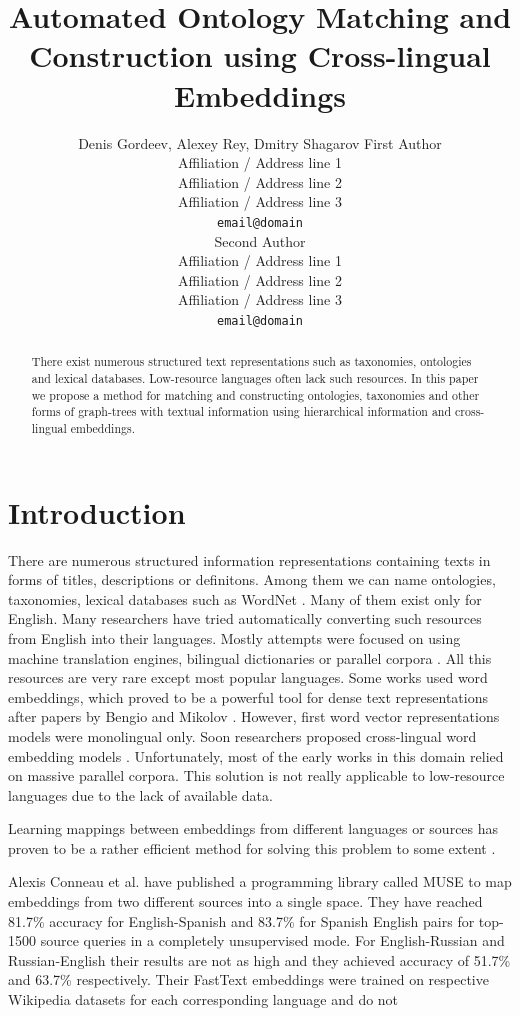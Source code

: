 \documentclass[11pt,a4paper]{article}
\title{Automated Ontology Matching and Construction using Cross-lingual Embeddings}
\author{Denis Gordeev, Alexey Rey, Dmitry Shagarov
	First Author \\
  Affiliation / Address line 1 \\
  Affiliation / Address line 2 \\
  Affiliation / Address line 3 \\
  \texttt{email@domain} \\\And
  Second Author \\
  Affiliation / Address line 1 \\
  Affiliation / Address line 2 \\
  Affiliation / Address line 3 \\
  \texttt{email@domain} \\}
\date{}
\begin{document}
\maketitle
\begin{abstract}
There exist numerous structured text representations such as taxonomies, ontologies and lexical databases. Low-resource languages often lack such resources. In this paper we propose a method for matching and constructing ontologies, taxonomies and other forms of graph-trees with textual information using hierarchical information and cross-lingual embeddings.
\end{abstract}

\section{Introduction}

There are numerous structured information representations containing texts in forms of titles, descriptions or definitons. Among them we can name ontologies, taxonomies, lexical databases such as WordNet \cite{wordnet}. Many of them exist only for English. Many researchers have tried automatically converting such resources from English into their languages. Mostly attempts were focused on using machine translation engines, bilingual dictionaries or parallel corpora \cite{Khodak2017,NEALE18.1030}. All this resources are very rare except most popular languages. Some works used word embeddings, which proved to be a powerful tool for dense text representations after papers by Bengio \cite{bengio} and Mikolov \cite{mikolov-representations-2013}. However, first word vector representations models were monolingual only. Soon researchers proposed cross-lingual word embedding models \cite{mikolov-parallel,lazaridou-parallel}. Unfortunately, most of the early works in this domain relied on massive parallel corpora. This solution is not really applicable to low-resource languages due to the lack of available data.

Learning mappings between embeddings from different languages or sources has proven to be a rather efficient method for solving this problem to some extent \cite{ruder-survey}.

Alexis Conneau et al. \cite{muse} have published a programming library called MUSE to map embeddings from two different sources into a single space. They have reached 81.7\% accuracy for English-Spanish and 83.7\% for Spanish English pairs for top-1500 source queries in a completely unsupervised mode. For English-Russian and Russian-English their results are not as high and they achieved accuracy of 51.7\% and 63.7\% respectively. Their FastText embeddings were trained on respective Wikipedia datasets for each corresponding language and do not 
\end{document}
